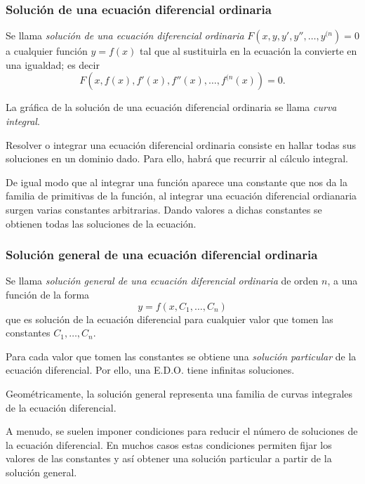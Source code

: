 \begin{frame}
	\frametitle{Solución de una ecuación diferencial ordinaria}
	\begin{definicion}
		Se llama \emph{solución de una ecuación diferencial ordinaria} $F(x,y,y',y'',\ldots,y^{(n})=0$ a cualquier función $y =f(x)$ tal que al sustituirla en la ecuación la convierte en una igualdad; es decir 
		\[
			F(x,f(x), f'(x), f''(x),\ldots, f^{(n}(x))=0.
		\]
				
		La gráfica de la solución de una ecuación diferencial ordinaria se llama \emph{curva integral}.
	\end{definicion}
		
	Resolver o integrar una ecuación diferencial ordinaria consiste en hallar todas sus soluciones en un dominio dado. Para ello, habrá que recurrir al cálculo integral.
		
	De igual modo que al integrar una función aparece una constante que nos da la familia de primitivas de la función,  al integrar una ecuación diferencial ordianaria surgen varias constantes arbitrarias. Dando valores a dichas constantes se obtienen todas las soluciones de la ecuación.
\end{frame}


\begin{frame}
	\frametitle{Solución general de una ecuación diferencial ordinaria}
	\begin{definicion}
		Se llama \emph{solución general de una ecuación diferencial ordinaria} de orden $n$, a una función de la forma 
		\[y =f (x,C_1,\ldots,C_n)\] 
		que es solución de la ecuación diferencial para cualquier valor que tomen las constantes $C_1,\ldots,C_n$.
	\end{definicion}
		
	Para cada valor que tomen las constantes se obtiene una \emph{solución particular} de la ecuación diferencial. Por ello, una E.D.O. tiene infinitas soluciones.
		
	Geométricamente, la solución general representa una familia de curvas integrales de la ecuación diferencial.
		
	A menudo, se suelen imponer condiciones para reducir el número de soluciones de la  ecuación diferencial. En muchos casos estas condiciones permiten fijar los valores de las constantes y así obtener una solución particular a partir de la solución general.
\end{frame}


